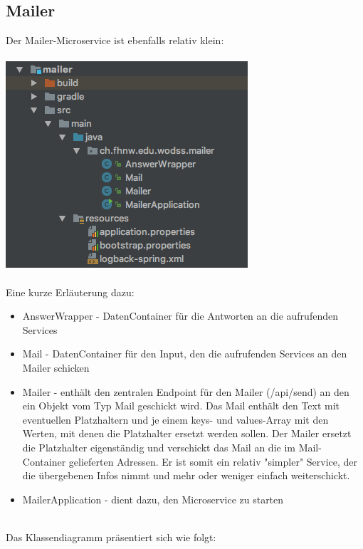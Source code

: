 \documentclass[11pt]{article} %
\begin{document}
\subsection{Mailer}
Der Mailer-Microservice ist ebenfalls relativ klein:
\\
\\
\includegraphics[scale=0.7]{structure_mailer}
\\
\\
Eine kurze Erläuterung dazu:
\begin{itemize}
\item AnswerWrapper - DatenContainer für die Antworten an die aufrufenden Services
\item Mail - DatenContainer für den Input, den die aufrufenden Services an den Mailer schicken
\item Mailer - enthält den zentralen Endpoint für den Mailer (/api/send) an den ein Objekt vom Typ Mail geschickt wird. Das Mail enthält den Text mit eventuellen Platzhaltern und je einem keys- und values-Array mit den Werten, mit denen die Platzhalter ersetzt werden sollen. Der Mailer ersetzt die Platzhalter eigenständig und verschickt das Mail an die im Mail-Container gelieferten Adressen. Er ist somit ein relativ "simpler" Service, der die übergebenen Infos nimmt und mehr oder weniger einfach weiterschickt.
\item MailerApplication - dient dazu, den Microservice zu starten
\end{itemize}
\leavevmode \\
Das Klassendiagramm präsentiert sich wie folgt:
\\
\\
\end{document}
